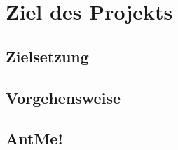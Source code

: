 \section{Ziel des Projekts}
\label{concept}

\subsection{Zielsetzung}

\subsection{Vorgehensweise}

\subsection{AntMe!}
